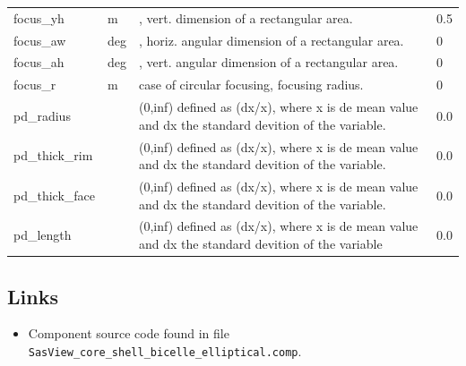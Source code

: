 \begin{longtable}{p{}p{}p{}p{}}
focus\_yh & m & , vert. dimension of a rectangular area. & 0.5 \\
focus\_aw & deg & , horiz. angular dimension of a rectangular area. & 0 \\
focus\_ah & deg & , vert. angular dimension of a rectangular area. & 0 \\
focus\_r & m & case of circular focusing, focusing radius. & 0 \\
pd\_radius &  & (0,inf) defined as (dx/x), where x is de mean value and dx the standard devition of the variable. & 0.0 \\
pd\_thick\_rim &  & (0,inf) defined as (dx/x), where x is de mean value and dx the standard devition of the variable. & 0.0 \\
pd\_thick\_face &  & (0,inf) defined as (dx/x), where x is de mean value and dx the standard devition of the variable. & 0.0 \\
pd\_length &  & (0,inf) defined as (dx/x), where x is de mean value and dx the standard devition of the variable & 0.0 \\
\bottomrule
\end{longtable}

\subsection*{Links}
\begin{itemize}
  \item Component source code found in file \texttt{SasView\_core\_shell\_bicelle\_elliptical.comp}.
\end{itemize}

